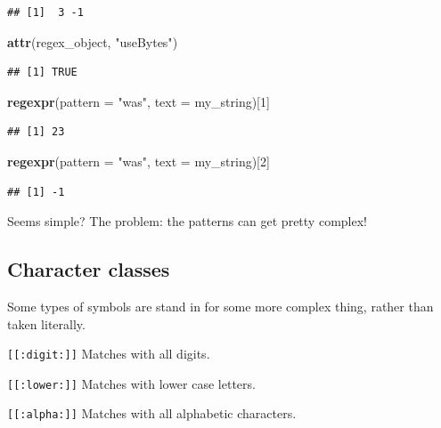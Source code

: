 \documentclass[]{book}
\newenvironment{Shaded}{\begin{snugshade}}{\end{snugshade}}
\newcommand{\DataTypeTok}[1]{\textcolor[rgb]{0.13,0.29,0.53}{#1}}
\newcommand{\DecValTok}[1]{\textcolor[rgb]{0.00,0.00,0.81}{#1}}
\newcommand{\KeywordTok}[1]{\textcolor[rgb]{0.13,0.29,0.53}{\textbf{#1}}}
\newcommand{\NormalTok}[1]{#1}
\newcommand{\StringTok}[1]{\textcolor[rgb]{0.31,0.60,0.02}{#1}}
\theoremstyle{definition}
\theoremstyle{definition}
\theoremstyle{definition}
\theoremstyle{remark}
\begin{document}
\begin{Shaded}
\begin{Highlighting}[]
\begin{Shaded}
\begin{Highlighting}[]
\begin{Shaded}
\begin{Highlighting}[]
\begin{verbatim}
## [1]  3 -1
\end{verbatim}

\begin{Shaded}
\begin{Highlighting}[]
\KeywordTok{attr}\NormalTok{(regex_object, }\StringTok{"useBytes"}\NormalTok{)}
\end{Highlighting}
\end{Shaded}

\begin{verbatim}
## [1] TRUE
\end{verbatim}

\begin{Shaded}
\begin{Highlighting}[]
\KeywordTok{regexpr}\NormalTok{(}\DataTypeTok{pattern =} \StringTok{"was"}\NormalTok{, }\DataTypeTok{text =}\NormalTok{ my_string)[}\DecValTok{1}\NormalTok{]}
\end{Highlighting}
\end{Shaded}

\begin{verbatim}
## [1] 23
\end{verbatim}

\begin{Shaded}
\begin{Highlighting}[]
\KeywordTok{regexpr}\NormalTok{(}\DataTypeTok{pattern =} \StringTok{"was"}\NormalTok{, }\DataTypeTok{text =}\NormalTok{ my_string)[}\DecValTok{2}\NormalTok{]}
\end{Highlighting}
\end{Shaded}

\begin{verbatim}
## [1] -1
\end{verbatim}

Seems simple? The problem: the patterns can get pretty complex!

\hypertarget{character-classes}{%
\subsection{Character classes}\label{character-classes}}

Some types of symbols are stand in for some more complex thing, rather than taken literally.

\texttt{{[}{[}:digit:{]}{]}} Matches with all digits.

\texttt{{[}{[}:lower:{]}{]}} Matches with lower case letters.

\texttt{{[}{[}:alpha:{]}{]}} Matches with all alphabetic characters.


\end{Highlighting}
\end{Shaded}
\end{Highlighting}
\end{Shaded}
\end{Highlighting}
\end{Shaded}
\end{document}
